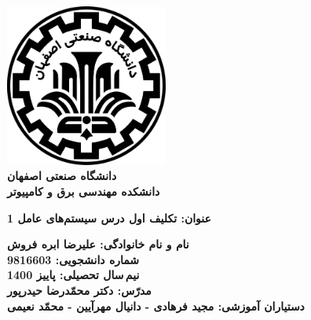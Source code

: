 \begin{titlepage}
\begin{center}
\includegraphics[width=0.4\textwidth]{IUT Logo.png}\\
        
\LARGE
\textbf{دانشگاه صنعتی اصفهان}\\
\textbf{دانشکده مهندسی برق و کامپیوتر}\\
        
\vfill
        
\huge
\textbf{عنوان: تکلیف اول درس سیستم‌های عامل 1}\\
        
\vfill
        
\LARGE
\textbf{نام و نام خانوادگی: علیرضا ابره فروش}\\
\textbf{شماره دانشجویی: 9816603}\\
\textbf{نیم\,سال تحصیلی: پاییز 1400}\\
\textbf{مدرّس: دکتر محمّدرضا حیدرپور}\\
\textbf{دستیاران آموزشی: مجید فرهادی - دانیال مهرآیین - محمّد نعیمی}\\
\end{center}
\end{titlepage}
